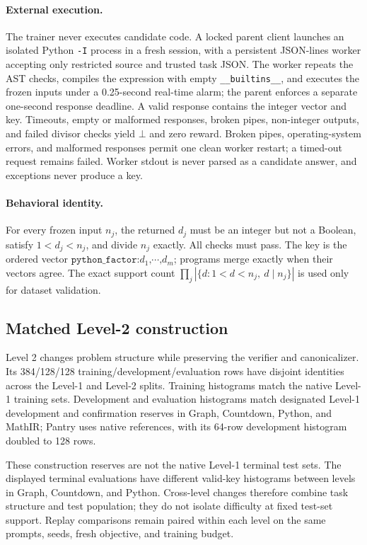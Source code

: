 \documentclass{article}
\newcommand{\1}{\mathbf 1}
\theoremstyle{remark}
\theoremstyle{definition}
\theoremstyle{plain}
\begin{document}
\paragraph{External execution.}
\label{app:python-process}
The trainer never executes candidate code. A locked parent client launches
an isolated Python \texttt{-I} process in a fresh session, with a persistent
JSON-lines worker accepting only restricted source and trusted task JSON.
The worker repeats the AST checks, compiles the expression with empty
\texttt{\_\_builtins\_\_}, and executes the frozen inputs under a
0.25-second real-time alarm; the parent enforces a separate one-second
response deadline. A valid response contains the integer vector and key.
Timeouts, empty or malformed responses, broken pipes, non-integer outputs,
and failed divisor checks yield $\bot$ and zero reward. Broken pipes,
operating-system errors, and malformed responses permit one clean worker
restart; a timed-out request remains failed. Worker stdout is never parsed
as a candidate answer, and exceptions never produce a key.

\paragraph{Behavioral identity.}
\label{app:python-identity}
For every frozen input $n_j$, the returned $d_j$ must be an integer but not a
Boolean, satisfy $1<d_j<n_j$, and divide $n_j$ exactly. All checks must pass.
The key is the ordered vector
$\texttt{python\_factor:}d_1\texttt{,}\cdots\texttt{,}d_m$;
programs merge exactly when their vectors agree. The exact support count
$\prod_j|\{d:1<d<n_j,\ d\mid n_j\}|$ is used only for dataset validation.

\subsection{Matched Level-2 construction}
\label{app:data-levels}

Level 2 changes problem structure while preserving the verifier and
canonicalizer. Its 384/128/128 training/development/evaluation rows have
disjoint identities across the Level-1 and Level-2 splits. Training histograms
match the native Level-1 training sets. Development and evaluation histograms
match designated Level-1 development and confirmation reserves in Graph,
Countdown, Python, and MathIR; Pantry uses native references, with its
64-row development histogram doubled to 128 rows.

These construction reserves are not the native Level-1 terminal test sets.
The displayed terminal evaluations have different valid-key histograms
between levels in Graph, Countdown, and Python. Cross-level changes therefore
combine task structure and test population; they do not isolate difficulty
at fixed test-set support. Replay comparisons remain paired within each
level on the same prompts, seeds, fresh objective, and training budget.
\end{document}
